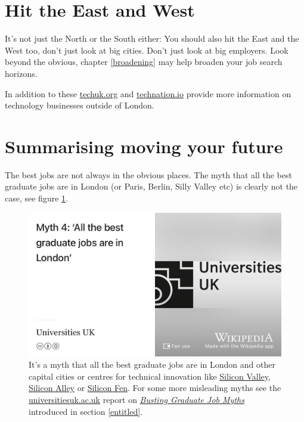 \documentclass[
]{book}
\begin{document}
\hypertarget{eastwest}{%
\section{Hit the East and West}\label{eastwest}}

It's not just the North or the South either: You should also hit the East and the West too, don't just look at big cities. Don't just look at big employers. Look beyond the obvious, chapter \ref{broadening} may help broaden your job search horizons.

In addition to these \href{https://www.techuk.org}{techuk.org} and \href{https://technation.io}{technation.io} provide more information on technology businesses outside of London.

\hypertarget{tldr16}{%
\section{Summarising moving your future}\label{tldr16}}

The best jobs are not always in the obvious places. The myth that all the best graduate jobs are in London (or Paris, Berlin, Silly Valley etc) is clearly not the case, see figure \ref{fig:uuk-fig}.

\begin{figure}
\includegraphics[width=1\linewidth]{images/uuk} \caption{It's a myth that all the best graduate jobs are in London and other capital cities or centres for technical innovation like \href{https://en.wikipedia.org/wiki/Silicon_Valley}{Silicon Valley}, \href{https://en.wikipedia.org/wiki/Silicon_Alley}{Silicon Alley} or \href{https://en.wikipedia.org/wiki/Silicon_Fen}{Silicon Fen}. For some more misleading myths see the \href{https://www.universitiesuk.ac.uk/}{universitiesuk.ac.uk} report on \emph{\href{https://www.universitiesuk.ac.uk/what-we-do/policy-and-research/publications/busting-graduate-job-myths}{Busting Graduate Job Myths}} introduced in section \ref{entitled}. \citep{ballmyths}}\label{fig:uuk-fig}
\end{figure}
\end{document}
